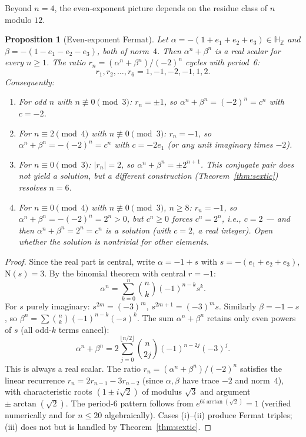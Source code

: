 \documentclass[11pt]{amsart}
\theoremstyle{plain}
\newtheorem{proposition}[theorem]{Proposition}
\theoremstyle{definition}
\theoremstyle{remark}
\newcommand{\Z}{\mathbb{Z}}
\newcommand{\HH}{\mathbb{H}}
\newcommand{\Norm}[1]{\mathrm{N}(#1)}
\begin{document}
Beyond $n = 4$, the even-exponent picture depends on the residue class
of $n$ modulo $12$.

\begin{proposition}[Even-exponent Fermat]\label{prop:even}
Let $\alpha = -(1 + e_1 + e_2 + e_3) \in \HH_\Z$ and
$\beta = -(1 - e_1 - e_2 - e_3)$, both of norm~$4$.
Then $\alpha^n + \beta^n$ is a real scalar for every $n \geq 1$.
The ratio $r_n = (\alpha^n + \beta^n)/(-2)^n$ cycles with period~6:
\[
  r_1, r_2, \ldots, r_6 = 1, -1, -2, -1, 1, 2.
\]
Consequently:
\begin{enumerate}[label=(\roman*)]
  \item For odd $n$ with $n \not\equiv 0 \pmod{3}$:
    $r_n = \pm 1$, so $\alpha^n + \beta^n = (-2)^n = c^n$ with $c = -2$.
  \item For $n \equiv 2 \pmod{4}$ with $n \not\equiv 0 \pmod{3}$:
    $r_n = -1$, so $\alpha^n + \beta^n = -(-2)^n = c^n$ with
    $c = -2e_1$ (or any unit imaginary times $-2$).
  \item For $n \equiv 0 \pmod{3}$: $|r_n| = 2$, so $\alpha^n + \beta^n = \pm 2^{n+1}$.
    This conjugate pair does not yield a solution, but a \emph{different}
    construction (Theorem~\ref{thm:sextic}) resolves $n = 6$.
  \item For $n \equiv 0 \pmod{4}$ with $n \not\equiv 0 \pmod{3}$, $n \geq 8$:
    $r_n = -1$, so $\alpha^n + \beta^n = -(-2)^n = 2^n > 0$,
    but $c^n \geq 0$ forces $c^n = 2^n$, i.e., $c = 2$ ---
    and then $\alpha^n + \beta^n = 2^n = c^n$ \emph{is} a solution
    (with $c = 2$, a real integer).
    Open whether the solution is nontrivial for other elements.
\end{enumerate}
\end{proposition}

\begin{proof}
Since the real part is central, write $\alpha = -1 + s$ with $s = -(e_1+e_2+e_3)$,
$\Norm{s} = 3$. By the binomial theorem with central $r = -1$:
\[
  \alpha^n = \sum_{k=0}^{n} \binom{n}{k}(-1)^{n-k} s^k.
\]
For $s$ purely imaginary: $s^{2m} = (-3)^m$, $s^{2m+1} = (-3)^m s$.
Similarly $\beta = -1 - s$, so $\beta^n = \sum \binom{n}{k}(-1)^{n-k}(-s)^k$.
The sum $\alpha^n + \beta^n$ retains only even powers of $s$ (all odd-$k$ terms cancel):
\[
  \alpha^n + \beta^n = 2\sum_{j=0}^{\lfloor n/2 \rfloor} \binom{n}{2j}(-1)^{n-2j}(-3)^j.
\]
This is always a real scalar. The ratio $r_n = (\alpha^n + \beta^n)/(-2)^n$
satisfies the linear recurrence $r_n = 2r_{n-1} - 3r_{n-2}$
(since $\alpha, \beta$ have trace $-2$ and norm~$4$),
with characteristic roots $(1 \pm i\sqrt{2})$ of modulus $\sqrt{3}$
and argument $\pm \arctan(\sqrt{2})$.
The period-6 pattern follows from $e^{6i\arctan(\sqrt{2})} = 1$
(verified numerically and for $n \leq 20$ algebraically).
Cases (i)--(ii) produce Fermat triples; (iii) does not but is handled by
Theorem~\ref{thm:sextic}.
\end{proof}
\end{document}
